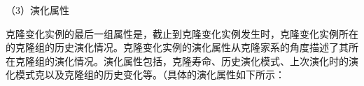 
（3）演化属性

克隆变化实例的最后一组属性是，截止到克隆变化实例发生时，克隆变化实例所在的克隆组的历史演化情况。克隆变化实例的演化属性从克隆家系的角度描述了其所在克隆组的演化情况。演化属性包括，克隆寿命、历史演化模式、上次演化时的演化模式克以及克隆组的历史变化等。（具体的演化属性如下所示：

